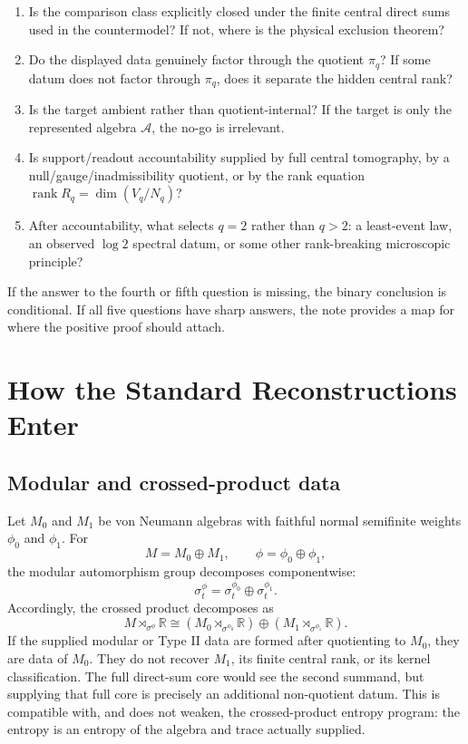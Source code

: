 \documentclass[12pt]{article}
\theoremstyle{definition}
\theoremstyle{remark}
\newcommand{\A}{\mathcal A}
\newcommand{\R}{\mathbb R}
\begin{document}
\begin{enumerate}
  \item Is the comparison class explicitly closed under the finite central
  direct sums used in the countermodel?  If not, where is the physical
  exclusion theorem?
  \item Do the displayed data genuinely factor through the quotient
  \(\pi_q\)?  If some datum does not factor through \(\pi_q\), does it separate
  the hidden central rank?
  \item Is the target ambient rather than quotient-internal?  If the target is
  only the represented algebra \(\A\), the no-go is irrelevant.
  \item Is support/readout accountability supplied by full central tomography,
  by a null/gauge/inadmissibility quotient, or by the rank equation
  \(\operatorname{rank}R_q=\dim(V_q/N_q)\)?
  \item After accountability, what selects \(q=2\) rather than \(q>2\): a
  least-event law, an observed \(\log2\) spectral datum, or some other
  rank-breaking microscopic principle?
\end{enumerate}

If the answer to the fourth or fifth question is missing, the binary conclusion
is conditional.  If all five questions have sharp answers, the note provides a
map for where the positive proof should attach.

\section{How the Standard Reconstructions Enter}

\subsection{Modular and crossed-product data}

Let \(M_0\) and \(M_1\) be von Neumann algebras with faithful normal
semifinite weights \(\phi_0\) and \(\phi_1\).  For
\[
  M=M_0\oplus M_1,\qquad \phi=\phi_0\oplus\phi_1,
\]
the modular automorphism group decomposes componentwise:
\[
  \sigma_t^\phi=\sigma_t^{\phi_0}\oplus\sigma_t^{\phi_1}.
\]
Accordingly, the crossed product decomposes as
\[
  M\rtimes_{\sigma^\phi}\R
  \cong
  (M_0\rtimes_{\sigma^{\phi_0}}\R)\oplus
  (M_1\rtimes_{\sigma^{\phi_1}}\R).
\]
If the supplied modular or Type II data are formed after quotienting to
\(M_0\), they are data of \(M_0\).  They do not recover \(M_1\), its finite
central rank, or its kernel classification.  The full direct-sum core would see
the second summand, but supplying that full core is precisely an additional
non-quotient datum.  This is compatible with, and does not weaken, the
crossed-product entropy program: the entropy is an entropy of the algebra and
trace actually supplied.
\end{document}
